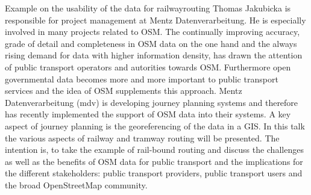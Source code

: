 %
{Example on the usability of the data for railwayrouting}%
{Thomas Jakubicka is responsible for project management at Mentz Datenverarbeitung. He is especially involved in many projects related to OSM.}%
{The continually improving accuracy, grade of detail and completeness in OSM data on the one hand and the always rising demand for data with higher information density, has drawn the attention of public transport operators and autorities towards OSM. Furthermore open governmental data becomes more and more important to public transport services and the idea of OSM supplements this approach.
Mentz Datenverarbeitung (mdv) is developing journey planning systems and therefore has recently implemented the support of OSM data into their systems. A key aspect of journey planning is the georeferencing of the data in a GIS. In this talk the various aspects of railway and tramway routing will be presented. The intention is, to take the example of rail-bound routing and discuss the challenges as well as the benefits of OSM data for public transport and the implications for the different stakeholders: public transport providers, public transport users and the broad OpenStreetMap community.}


